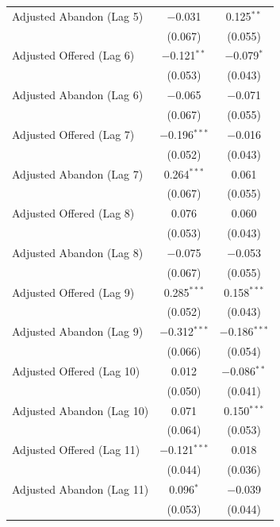\documentclass[manuscript,screen,authorversion]{acmart}
\begin{document}
\begin{table}[htbp]
\begin{tabularx}{0.92\linewidth}{@{\extracolsep{\fill}}>{\raggedright\arraybackslash}Xcc}
Adjusted Abandon (Lag 5)  & $-$0.031 & 0.125$^{**}$ \\
 & (0.067) & (0.055) \\

Adjusted Offered (Lag 6)  & $-$0.121$^{**}$ & $-$0.079$^{*}$ \\
 & (0.053) & (0.043) \\

Adjusted Abandon (Lag 6)  & $-$0.065 & $-$0.071 \\
 & (0.067) & (0.055) \\

Adjusted Offered (Lag 7)  & $-$0.196$^{***}$ & $-$0.016 \\
 & (0.052) & (0.043) \\

Adjusted Abandon (Lag 7)  & 0.264$^{***}$ & 0.061 \\
 & (0.067) & (0.055) \\

Adjusted Offered (Lag 8)  & 0.076 & 0.060 \\
 & (0.053) & (0.043) \\

Adjusted Abandon (Lag 8)  & $-$0.075 & $-$0.053 \\
 & (0.067) & (0.055) \\

Adjusted Offered (Lag 9)  & 0.285$^{***}$ & 0.158$^{***}$ \\
 & (0.052) & (0.043) \\

Adjusted Abandon (Lag 9)  & $-$0.312$^{***}$ & $-$0.186$^{***}$ \\
 & (0.066) & (0.054) \\

Adjusted Offered (Lag 10) & 0.012 & $-$0.086$^{**}$ \\
 & (0.050) & (0.041) \\

Adjusted Abandon (Lag 10) & 0.071 & 0.150$^{***}$ \\
 & (0.064) & (0.053) \\

Adjusted Offered (Lag 11) & $-$0.121$^{***}$ & 0.018 \\
 & (0.044) & (0.036) \\

Adjusted Abandon (Lag 11) & 0.096$^{*}$ & $-$0.039 \\
 & (0.053) & (0.044) \\


\end{tabularx}
\end{table}
\end{document}
